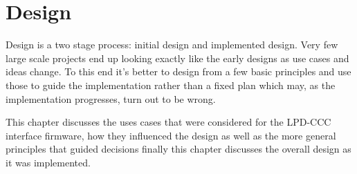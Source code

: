 \ifpdf
{}
\else
{}
\fi

\chapter{Design} %
\label{cha:design}
Design is a two stage process: initial design and implemented design. Very few large scale projects end up looking exactly like the early designs as use cases and ideas change. To this end it's better to design from a few basic principles and use those to guide the implementation rather than a fixed plan which may, as the implementation progresses, turn out to be wrong.

This chapter discusses the uses cases that were considered for the LPD-CCC interface firmware, how they influenced the design as well as the more general principles that guided decisions finally this chapter discusses the overall design as it was implemented.
% 
% 
% 
% 
